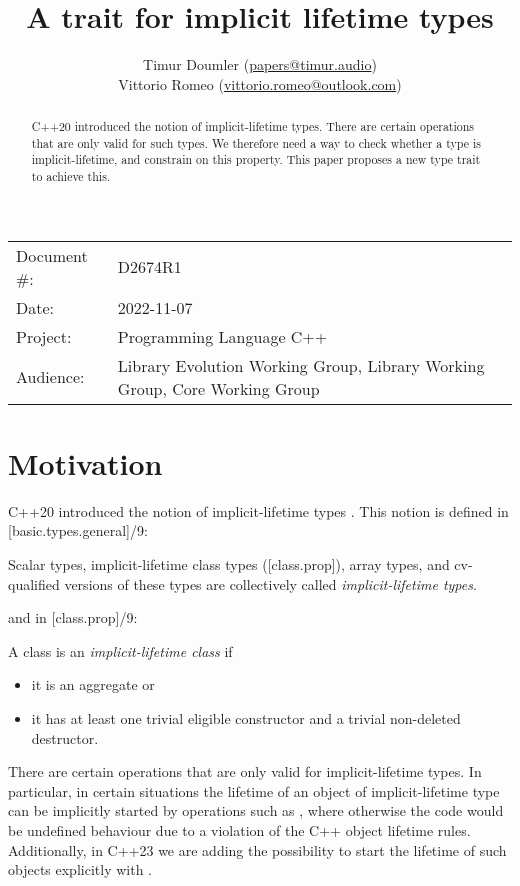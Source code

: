 


\title{A trait for implicit lifetime types}
\author{ Timur Doumler \small(\href{mailto:papers@timur.audio}{papers@timur.audio})  \\ Vittorio Romeo \small(\href{mailto:vittorio.romeo@outlook.com}{vittorio.romeo@outlook.com}) }
\date{}
\maketitle

\begin{tabular}{ll}
Document \#: & D2674R1 \\
Date: &2022-11-07 \\
Project: & Programming Language C++ \\
Audience: & Library Evolution Working Group, Library Working Group, Core Working Group
\end{tabular}

\begin{abstract}
C++20 introduced the notion of implicit-lifetime types. There are certain operations that are only valid for such types. We therefore need a way to check whether a type is implicit-lifetime, and constrain on this property. This paper proposes a new type trait  to achieve this.
\end{abstract}

\section{Motivation}
\label{sec:motivation}

C++20 introduced the notion of implicit-lifetime types \cite{P0593R6}. This notion is defined in [basic.types.general]/9:

\begin{adjustwidth}{0.5cm}{0.5cm}
Scalar types, implicit-lifetime class types ([class.prop]), array types, and cv-qualified versions of these types are collectively called \emph{implicit-lifetime types}.
\end{adjustwidth}

and in [class.prop]/9:

\begin{adjustwidth}{0.5cm}{0.5cm}
A class  is an \emph{implicit-lifetime class} if 
\begin{itemize}
\item it is an aggregate or
\item it has at least one trivial eligible constructor and a trivial non-deleted destructor.
\end{itemize}
\end{adjustwidth}
There are certain operations that are only valid for implicit-lifetime types. In particular, in certain situations the lifetime of an object of implicit-lifetime type can be implicitly started by operations such as , where otherwise the code would be undefined behaviour due to a violation of the C++ object lifetime rules. Additionally, in C++23 we are adding the possibility to start the lifetime of such objects explicitly with  \cite{P2590R2}.

